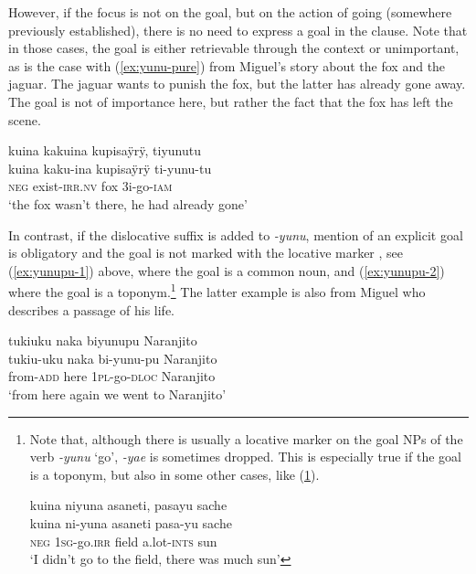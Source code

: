 However, if the focus is not on the goal, but on the action of going (somewhere previously established), there is no need to express a goal in the clause. Note that in those cases, the goal is either retrievable through the context or unimportant, as is the case with (\ref{ex:yunu-pure}) from Miguel’s story about the fox and the jaguar. The jaguar wants to punish the fox, but the latter has already gone away. The goal is not of importance here, but rather the fact that the fox has left the scene.

\ea\label{ex:yunu-pure}
\begingl
\glpreamble kuina kakuina kupisaÿrÿ, tiyunutu\\
\gla kuina kaku-ina kupisaÿrÿ ti-yunu-tu\\
\glb \textsc{neg} exist-\textsc{irr.nv} fox 3i-go-\textsc{iam}\\
\glft ‘the fox wasn’t there, he had already gone’
\endgl
\trailingcitation{[jmx-n120429ls-x5.167-168]}
\xe

In contrast, if the dislocative suffix is added to \textit{-yunu}, mention of an explicit goal is obligatory and the goal is not marked with the locative marker , see (\ref{ex:yunupu-1}) above, where the goal is a common noun, and (\ref{ex:yunupu-2}) where the goal is a toponym.\footnote{Note that, although there is usually a locative marker on the goal NPs of the verb \textit{-yunu} ‘go’, \textit{-yae} is sometimes dropped. This is especially true if the goal is a toponym, but also in some other cases, like %
 (\ref{ex:yunu-GOAL-3}).


\ea\label{ex:yunu-GOAL-3}
\begingl 
\glpreamble kuina niyuna asaneti, pasayu sache\\
\gla kuina ni-yuna asaneti pasa-yu sache\\ 
\glb \textsc{neg} 1\textsc{sg}-go.\textsc{irr} field a.lot-\textsc{ints} sun\\ 
\glft ‘I didn’t go to the field, there was much sun’
\trailingcitation{[rmx-e150922l.004]}%
\xe
} The latter example is also from Miguel who describes a passage of his life.

\ea\label{ex:yunupu-2}
\begingl 
\glpreamble tukiuku naka biyunupu Naranjito\\
\gla tukiu-uku naka bi-yunu-pu Naranjito\\ 
\glb from-\textsc{add} here 1\textsc{pl}-go-\textsc{dloc} Naranjito\\ 
\glft ‘from here again we went to Naranjito’
\trailingcitation{[mxx-p110825l.181]}
\xe

